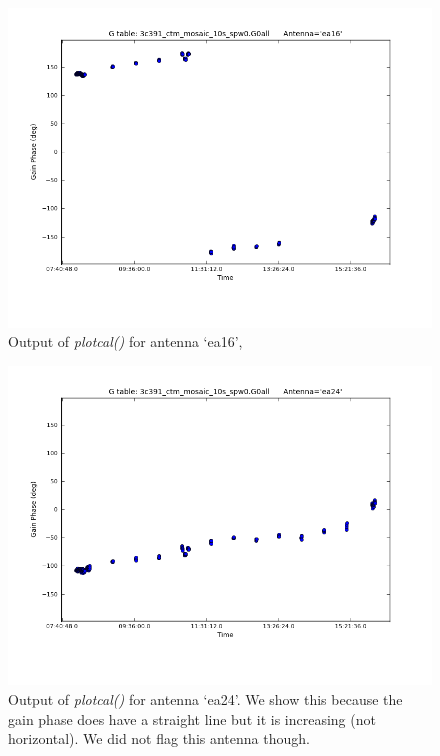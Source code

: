 \documentclass[12pt, a4paper]{article}
\begin{document}
\begin{figure}[h!]
    \centering
    \includegraphics[scale=0.5]{../Imaging/plots2/phase_calibration_part4c_question5_ea16_pol-L.png}
    \caption{Output of \emph{plotcal()} for antenna `ea16',  \label{fig:part4subC2-3-L}}
\end{figure}

\begin{figure}[h!]
    \centering
    \includegraphics[scale=0.5]{../Imaging/plots2/phase_calibration_part4c_question5_ea24_pol-L.png}
    \caption{Output of \emph{plotcal()} for antenna `ea24'. We show this because the gain phase does have a straight line but it is increasing (not horizontal). We did not flag this antenna though. \label{fig:part4subC2-4-L}}
\end{figure}
\newpage
\end{document}
